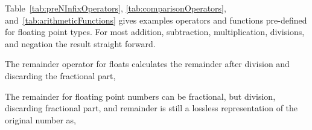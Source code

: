 Table~\ref{tab:preNInfixOperators}, \ref{tab:comparisonOperators}, and~\ref{tab:arithmeticFunctions} gives examples operators and functions pre-defined for floating point types. For most addition, subtraction, multiplication, divisions, and negation the result straight forward. 

The remainder operator for floats calculates the remainder after division and discarding the fractional part,
%

The remainder for floating point numbers can be fractional, but division, discarding fractional part, and remainder is still a lossless representation of the original number as,
%
%





